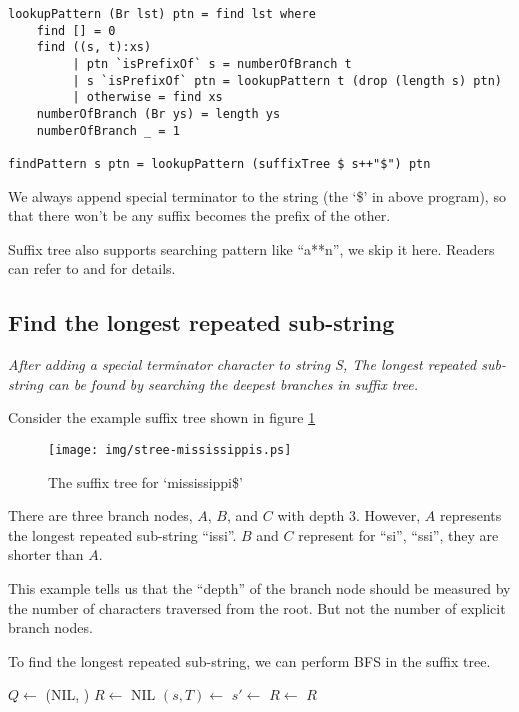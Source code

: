 \documentclass{article}
\begin{document}
\lstset{language=Haskell}
\begin{lstlisting}
lookupPattern (Br lst) ptn = find lst where
    find [] = 0
    find ((s, t):xs)
         | ptn `isPrefixOf` s = numberOfBranch t
         | s `isPrefixOf` ptn = lookupPattern t (drop (length s) ptn)
         | otherwise = find xs
    numberOfBranch (Br ys) = length ys
    numberOfBranch _ = 1

findPattern s ptn = lookupPattern (suffixTree $ s++"$") ptn
\end{lstlisting}

We always append special terminator to the string (the `\$' in above program),
so that there won't be any suffix becomes the prefix of the other\cite{wiki-suffix-tree}.

Suffix tree also supports searching pattern like ``a**n'', we skip it here.
Readers can refer to \cite{ukkonen-lec} and \cite{ukkonen-search} for details.

\subsection{Find the longest repeated sub-string}

{\em After adding a special terminator character to string S, The
longest repeated sub-string can be found by searching the
deepest branches in suffix tree.}

Consider the example suffix tree shown in figure \ref{fig:stree-mississippis}

\begin{figure}[htbp]
  \centering
  \texttt{[image: img/stree-mississippis.ps]}
  \caption{The suffix tree for `mississippi\$'} \label{fig:stree-mississippis}
\end{figure}

There are three branch nodes, $A$, $B$, and $C$ with depth 3. However, $A$ represents
the longest repeated sub-string ``issi''. $B$ and $C$ represent for ``si'', ``ssi'',
they are shorter than $A$.

This example tells us that the ``depth'' of the branch node should be measured
by the number of characters traversed from the root. But not the number of
explicit branch nodes.

To find the longest repeated sub-string, we can perform BFS in the suffix tree.

\begin{algorithmic}[1]
  \State $Q \gets$ (NIL, )
  \State $R \gets$ NIL
    \State $(s, T) \gets$ 
        \State $s' \gets$ 
        \State {}
        \State $R \gets$ 
      \EndIf
    \EndFor
  \EndWhile
  \State \Return $R$
\EndFunction
\end{algorithmic}
\end{document}
